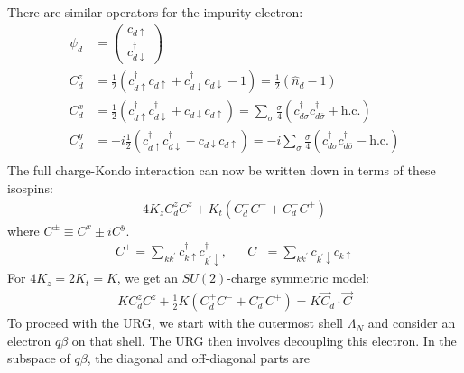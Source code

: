 \documentclass[twoside]{report}
\numberwithin{equation}{section}
\begin{document}
There are similar operators for the impurity electron:
\begin{equation}\begin{aligned}
\psi_d &= \begin{pmatrix} c_{d\uparrow} \\ c^\dagger_{d\downarrow} \end{pmatrix}\\
C^z_d &= \frac{1}{2}\left( c^\dagger_{d\uparrow}c_{d \uparrow} + c^\dagger_{d\downarrow}c_{d \downarrow} - 1  \right) = \frac{1}{2}\left( \hat n_d - 1 \right) \\
C^x_d &= \frac{1}{2}\left(c^\dagger_{d\uparrow}c^\dagger_{d \downarrow} + c_{d\downarrow}c_{d \uparrow} \right) = \sum_\sigma \frac{\sigma}{4}\left( c^\dagger_{d\sigma}c^\dagger_{d\overline\sigma} + \text{h.c.} \right) \\
C^y_d &= -i \frac{1}{2}\left(c^\dagger_{d\uparrow}c^\dagger_{d \downarrow} - c_{d\downarrow}c_{d \uparrow} \right) = -i\sum_\sigma \frac{\sigma}{4}\left( c^\dagger_{d\sigma}c^\dagger_{d\overline\sigma} - \text{h.c.} \right)\\
\end{aligned}\end{equation}
The full charge-Kondo interaction can now be written down in terms of these isospins:
\begin{equation}\begin{aligned}
	4K_z C_d^z C^z + K_t \left(C_d^+ C^-+ C_d^- C^+\right)
\end{aligned}\end{equation}
where \(C^\pm \equiv C^x \pm iC^y\).
\begin{equation}\begin{aligned}
	C^+ = \sum_{kk^\prime} c^\dagger_{k\uparrow}c^\dagger_{k^\prime\downarrow}, && C^- = \sum_{kk^\prime}c_{k^\prime\downarrow}c_{k\uparrow}
\end{aligned}\end{equation}
For \(4K_z = 2K_t=K\), we get an \(SU(2)\)-charge symmetric model:
\begin{equation}\begin{aligned}
	K C_d^z C^z + \frac{1}{2} K \left(C_d^+ C^-+ C_d^- C^+\right) = K \vec C_d \cdot \vec C
\end{aligned}\end{equation}
To proceed with the URG, we start with the outermost shell \(\Lambda_N\) and consider an electron \(q\beta\) on that shell.
The URG then involves decoupling this electron.
In the subspace of \(q\beta\), the diagonal and off-diagonal parts are
\end{document}
